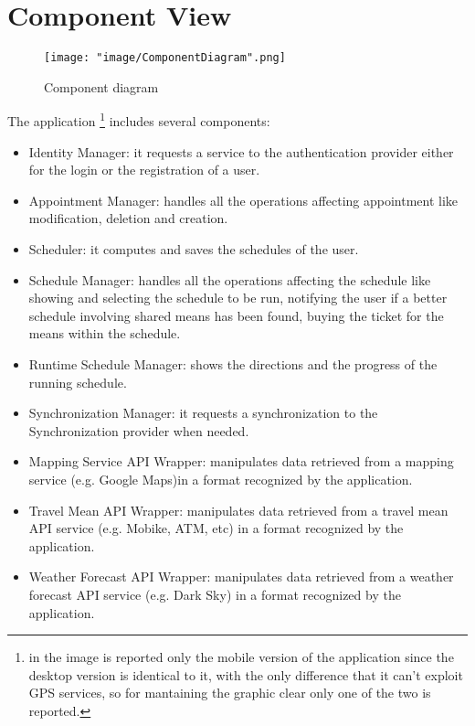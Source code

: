 \section{Component View}

\begin{figure}[H]
\begin{center}
\texttt{[image: "image/ComponentDiagram".png]}
\caption{Component diagram}
\end{center}
\end{figure}


The application \footnote{in the image is reported only the mobile version of the application since the desktop version is identical to it, with the only difference that it can't exploit GPS services, so for mantaining the graphic clear only one of the two is reported.}
includes several components: 
\begin{itemize}

\item Identity Manager: it requests a service to the authentication provider either for the login or the registration of a user. 

\item Appointment Manager: handles all the operations affecting appointment like modification, deletion and creation.
 
\item Scheduler: it computes and saves the schedules of the user.

\item Schedule Manager: handles all the operations affecting the schedule like showing and selecting the schedule to be run, notifying the user if a better schedule involving shared means has been found, buying the ticket for the means within the schedule. 

\item Runtime Schedule Manager: shows the directions and the progress of the running schedule.

\item Synchronization Manager: it requests a synchronization to the Synchronization provider when needed.

\item Mapping Service API Wrapper: manipulates data retrieved from a mapping service (e.g. Google Maps)in a format recognized by the application.

\item Travel Mean API Wrapper: manipulates data retrieved from a travel mean API service (e.g. Mobike, ATM, etc) in a format recognized by the application.

\item Weather Forecast API Wrapper: manipulates data retrieved from a weather forecast API service (e.g. Dark Sky) in a format recognized by the application.

\end{itemize}

